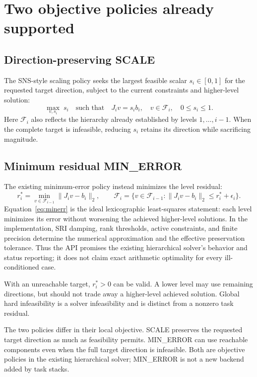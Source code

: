 \documentclass[11pt]{article}
\begin{document}
\section{Two objective policies already supported}

\subsection{Direction-preserving SCALE}
The SNS-style scaling policy seeks the largest feasible scalar
$s_i\in[0,1]$ for the requested target direction, subject to the current
constraints and higher-level solution:
\begin{equation}
  \max_{v,s_i}\;s_i
  \quad\text{such that}\quad J_i v=s_i b_i,\quad
  v\in\mathcal{F}_i,\quad 0\le s_i\le 1.
  \label{eq:scale}
\end{equation}
Here $\mathcal{F}_i$ also reflects the hierarchy already established by
levels $1,\ldots,i-1$. When the complete target is infeasible, reducing $s_i$
retains its direction while sacrificing magnitude.

\subsection{Minimum residual MIN\_ERROR}
The existing minimum-error policy instead minimizes the level residual:
\begin{equation}
  r_i^*=\min_{v\in\mathcal{F}_{i-1}}
       \|J_i v-b_i\|_2,
  \qquad
  \mathcal{F}_i=\{v\in\mathcal{F}_{i-1}:
       \|J_i v-b_i\|_2\le r_i^*+\epsilon_i\}.
  \label{eq:minerr}
\end{equation}
Equation~\eqref{eq:minerr} is the ideal lexicographic least-squares statement:
each level minimizes its error without worsening the achieved higher-level
solutions. In the implementation, SRI damping, rank thresholds, active
constraints, and finite precision determine the numerical approximation and
the effective preservation tolerance. Thus the API promises the existing
hierarchical solver's behavior and status reporting; it does not claim exact
arithmetic optimality for every ill-conditioned case.

With an unreachable target, $r_i^*>0$ can be valid. A lower level may use
remaining directions, but should not trade away a higher-level achieved
solution. Global hard infeasibility is a solver infeasibility and is distinct
from a nonzero task residual.

The two policies differ in their local objective. SCALE preserves the
requested target direction as much as feasibility permits. MIN\_ERROR can use
reachable components even when the full target direction is infeasible. Both
are objective policies in the existing hierarchical solver; MIN\_ERROR is not
a new backend added by task stacks.
\end{document}
